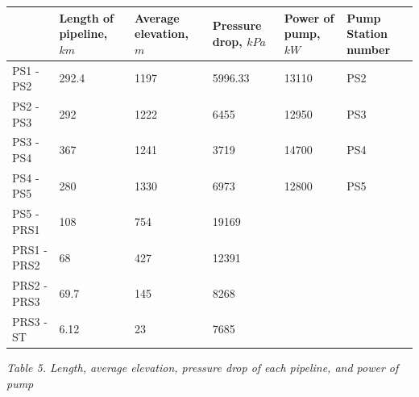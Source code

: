 \documentclass[12pt]{article}
\begin{document}
\begin{table}[H]
	\centering
	\begin{tabular}{|p{3cm}|p{2cm}|p{2cm}|p{2cm}|p{2cm}|p{2cm}|}
	  \hline
	    & Length of pipeline, $km$ & Average elevation, $m$ & Pressure drop, $kPa$ & Power of pump, $kW$ & Pump Station number \\
	  \hline
	  PS1 - PS2 & 292.4 & 1197 & 5996.33 & 13110 & PS2 \\
	  \hline
	  PS2 - PS3 & 292 & 1222 & 6455 & 12950 & PS3 \\
	  \hline
	  PS3 - PS4 & 367 & 1241 & 3719 & 14700 & PS4 \\
	  \hline
	  PS4 - PS5 & 280 & 1330 & 6973 & 12800 & PS5 \\
	  \hline 
	  PS5 - PRS1 & 108 & 754 & 19169 & &  \\
	  \hline
	  PRS1 - PRS2 & 68 & 427 & 12391 & & \\
	  \hline 
	  PRS2 - PRS3 & 69.7 & 145 & 8268 & & \\
	  \hline
	  PRS3 - ST & 6.12 & 23 & 7685 & & \\
	  \hline
	\end{tabular}
	\begin{center}
	\textit{Table 5. Length, average elevation, pressure drop of each pipeline, and power of pump }
	\end{center}
	\label{tab:your_table_label}
  \end{table}
\end{document}
